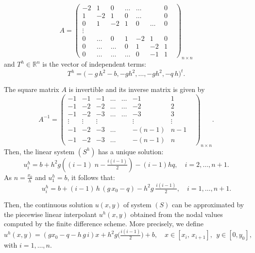 \documentclass[11pt]{article}
\begin{document}
    					\begin{equation}\label{matrizA}
    					A=\begin{pmatrix}
-2 & 1 & 0 & \ldots & \ldots & & 0 &\\                                                                                                   
1 &-2 & 1&0 &\ldots &&0 \\
0 &1& -2 & 1&0&\ldots &0 \\
\vdots\\
0 &\ldots &0 & 1&-2 & 1 &0\\
0 &\ldots & \ldots & 0&1 & -2 & 1\\
 0 &\ldots& \ldots& \ldots &  0& -1 &1
\end{pmatrix}_{n\times n}
\end{equation} 
    and ${T^h}\in \mathbb{R}^n$ is  the vector of independent terms:
    \begin{equation}\label{vectorT}
     {T^h}= \Big(-g\,h^2 - b, -g h^2, \ldots, -g h^2, -q\,h  \Big)^t.\end{equation}
    

     
    \noindent The square matrix $A$ is invertible and its inverse matrix is given by
\[A^{-1}=\begin{pmatrix}
-1 & -1 & -1 & \ldots & \ldots & -1 & 1 &\\                                                                                                   
-1 & -2 & -2 & \ldots & \ldots & -2 & 2 &\\                                                                                                   
-1 & -2 & -3 & \ldots & \ldots & -3 & 3 &\\                                                                                                   
\vdots & \vdots & \vdots  &&& \vdots  & \vdots\\
-1& -2 & -3 &\ldots && -(n-1) & n-1\\
 -1 & -2& -3& \ldots &  &-(n-1) &n
\end{pmatrix}_{n\times n}.\]%
Then, the linear system ${(S^h)}$ has a unique solution:
$$ {u^h_{i}}= b+  h^2g  \left( (i-1) \;n-\tfrac{i(i-1)}{2}\right)-(i-1) hq,\quad i=2 ,\ldots, n+1.$$   
As $n=\tfrac{x_0}{h}$ {and $u^h_1=b$}, it follows that:
    \[ \qquad\quad {u^h_i} = b + (i-1) \,h \,(g\,x_0-q) -  h^2 g \, \tfrac{\,i(i-1)\,}{2},\quad i=1, \ldots, n+1. \]
    
 
    
    
 Then, the continuous solution $u(x,y)$ of system $(S)$ can be approximated by the piecewise linear interpolant {$u^h(x,y)$} obtained from the nodal values computed by the finite difference scheme. More precisely, we define
          \begin{equation}\label{Def uh}
    	    {u^h}(x, y)= (g x_0  - q - h\, g\, i) x + h^2 g \Big(\tfrac{i(i-1)}{2}\Big) + b,\quad x \in [x_i, \,x_{i+1}], \,   \;y\in [0, y_0], 
          \end{equation}
with $i=1, \ldots , n.$
\end{document}
